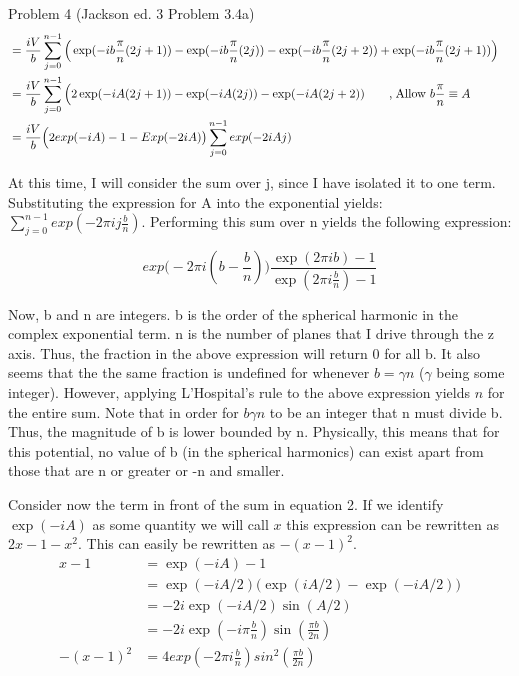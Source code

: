 \begin{homeworkProblem}{Problem 4 (Jackson ed. 3 Problem 3.4a)}
\begin{align}
	&= \frac{iV}{b} \sum\limits_{j=0}^{n-1} \Big( \exp(-ib\frac{\pi}{n}(2j+1)) - \exp(-ib \frac{\pi}{n}(2j)) - \exp(-ib \frac{\pi}{n}(2j+2)) + \exp(-ib \frac{\pi}{n}(2j+1)) \Big) \quad \nonumber \\
	&= \frac{iV}{b} \sum\limits_{j=0}^{n-1} \Big(2\exp(-iA(2j+1)) - \exp(-iA(2j)) -\exp(-iA(2j+2)) \quad\quad \text{,\;Allow $b \frac{\pi}{n} \equiv A$} \nonumber \\
	&= \frac{iV}{b} \Big(2exp(-iA)-1-Exp(-2iA)\big) \sum\limits_{j=0}^{n-1} exp(-2iAj) 
\end{align}

At this time, I will consider the sum over j, since I have isolated it to one term. Substituting the expression for A into the exponential yields: $\sum\limits_{j=0}^{n-1} exp(-2\pi i j \frac{b}{n})$. Performing this sum over n yields the following expression:

\[
exp\big(-2\pi i (b-\frac{b}{n})\big) \frac{\exp(2\pi i b)-1}{\exp(2\pi i \frac{b}{n})-1} \nonumber
\]

Now, b and n are integers. b is the order of the spherical harmonic in the complex exponential term. n is the number of planes that I drive through the z axis. Thus, the fraction in the above expression will return 0 for all b. It also seems that the the same fraction is undefined for whenever $b = \gamma n$ ($\gamma$ being some integer). However, applying L'Hospital's rule to the above expression yields $n$ for the entire sum. Note that in order for $b \gamma n$ to be an integer that n must divide b. Thus, the magnitude of b is lower bounded by n. Physically, this means that for this potential, no value of b (in the spherical harmonics) can exist apart from those that are n or greater or -n and smaller.
\\ \par
Consider now the term in front of the sum in equation 2. If we identify $\exp(-iA)$ as some quantity we will call $x$ this expression can be rewritten as $2x-1-x^2$. This can easily be rewritten as $-(x-1)^2$. 
\begin{align}
x-1 &= \exp(-iA)-1  \nonumber \\
&= \exp(-iA/2)\big(\exp(iA/2)-\exp(-iA/2)\big) \nonumber \\
&= -2i\exp(-iA/2)\sin(A/2) \nonumber \\
&= -2i\exp(-i\pi\frac{b}{n})\sin(\frac{\pi b}{2n}) \nonumber \\
-(x-1)^2 &= 4exp(-2\pi i \frac{b}{n})sin^2(\frac{\pi b}{2 n}) \nonumber
\end{align}


\end{homeworkProblem}
